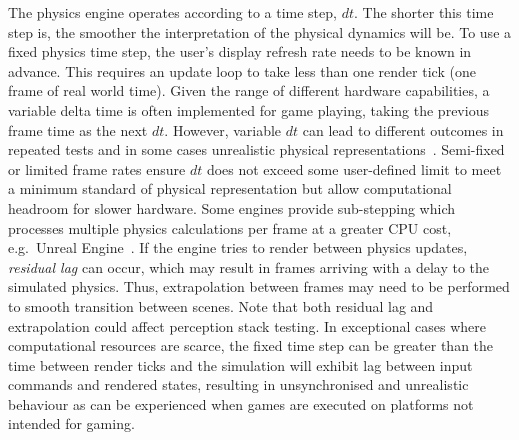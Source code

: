 \documentclass[letterpaper, 10 pt, journal, twoside]{IEEEtran}
\begin{document}
The physics engine operates according to a time step, $dt$. %
The shorter this time step is, the smoother the interpretation of the physical dynamics will be. %
%
%
To use a fixed physics time step, the user's display refresh rate needs to be known in advance. This requires an update loop to take less than one render tick (one frame of real world time). Given the range of different hardware capabilities, a variable delta time is often implemented for game playing, taking the previous frame time as the next $dt$. However, variable $dt$ can lead to different outcomes in repeated tests and in some cases unrealistic physical representations~\cite{gaffer}. 
%
Semi-fixed or limited frame rates ensure $dt$ does not exceed some user-defined limit to meet a minimum standard of physical representation but allow computational headroom for slower hardware. Some engines provide sub-stepping which processes multiple physics calculations per frame at a greater CPU cost, e.g.\ Unreal Engine~\cite{UE4_substepping}. 
%
If the engine tries to render between physics updates, \textit{residual lag} can occur, which may result in frames arriving with a delay to the simulated physics.
%
Thus, extrapolation between frames may need to be performed to smooth transition between scenes. 
%
Note that both residual lag and extrapolation could affect perception stack testing.
%
%
In exceptional cases where computational resources are scarce, the fixed time step can be greater than the time between render ticks %
and the simulation will exhibit lag between input commands and rendered states, resulting in unsynchronised and unrealistic behaviour as can be experienced when games are executed on platforms not intended for gaming. 
\end{document}
